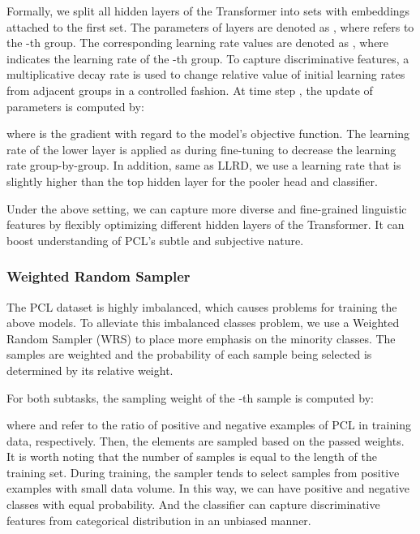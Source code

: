 \documentclass[11pt]{article}
\begin{document}
Formally, we split all hidden layers of the Transformer into  sets with embeddings attached to the first set.
The parameters of layers are denoted as , where  refers to the -th group. 
The corresponding learning rate values are denoted as , where  indicates the learning rate of the -th group. 
To capture discriminative features, a multiplicative decay rate  is used to change relative value of initial learning rates from adjacent groups in a controlled fashion. At time step , the update of parameters  is computed by:

where  is the gradient with regard to the model’s objective function.
The learning rate of the lower layer is applied as  during fine-tuning to decrease the learning rate group-by-group. 
In addition, same as LLRD, we use a learning rate that is slightly higher than the top hidden layer for the pooler head and classifier.


Under the above setting, we can capture more diverse and fine-grained linguistic features by flexibly optimizing different hidden layers of the Transformer.
It can boost understanding of PCL's subtle and subjective nature. 







\subsubsection{Weighted Random Sampler}
The PCL dataset is highly imbalanced, which causes problems for training the above models. 
To alleviate this imbalanced classes problem, we use a Weighted Random Sampler (WRS) to place more emphasis on the minority classes.
The samples are weighted and the probability of each sample being selected is determined by its relative weight.

For both subtasks, the sampling weight of the -th sample is computed by: 

where  and  refer to the ratio of positive and negative examples of PCL in training data, respectively. Then, the elements are sampled based on the passed weights. 
It is worth noting that the number of samples is equal to the length of the training set. 
During training, the sampler tends to select samples from positive examples with small data volume. 
In this way, we can have positive and negative classes with equal probability. And the classifier can capture discriminative features from categorical distribution in an unbiased manner.
\end{document}
